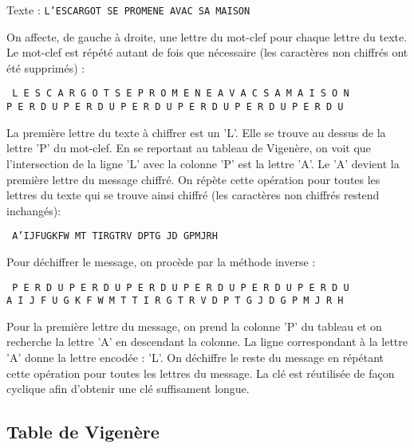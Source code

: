 Texte : \texttt{L'ESCARGOT SE PROMENE AVAC SA MAISON}

\vspace{0.5em}
On affecte, de gauche à droite, une lettre du mot-clef pour chaque lettre du texte. Le mot-clef est répété autant de fois que nécessaire (les caractères non chiffrés ont été supprimés) :

\begin{center}
\texttt{%
L E S C A R G O T S E P R O M E N E A V A C S A M A I S O N\\
P E R D U P E R D U P E R D U P E R D U P E R D U P E R D U
}
\end{center}

La première lettre du texte à chiffrer est un 'L'. Elle se trouve au dessus de la lettre 'P' du mot-clef. En se reportant au tableau de Vigenère, on voit que l'intersection de la ligne 'L' avec la colonne 'P' est la lettre 'A'. Le 'A' devient la première lettre du message chiffré. On répète cette opération pour toutes les lettres du texte qui se trouve ainsi chiffré (les caractères non chiffrés restend inchangés):

\begin{center}
\texttt{%
A'IJFUGKFW MT TIRGTRV DPTG JD GPMJRH
}
\end{center}

Pour déchiffrer le message, on procède par la méthode inverse :

\begin{center}
\texttt{%
P E R D U P E R D U P E R D U P E R D U P E R D U P E R D U \\
A I J F U G K F W M T T I R G T R V D P T G J D G P M J R H
}
\end{center}

Pour la première lettre du message, on prend la colonne 'P' du tableau et on recherche la lettre 'A' en descendant la colonne. La ligne correspondant à la lettre 'A' donne la lettre encodée : 'L'. On déchiffre le reste du message en répétant cette opération pour toutes les lettres du message. La clé est réutilisée de façon cyclique afin d'obtenir une clé suffisament longue.

\subsection{Table de Vigenère}

